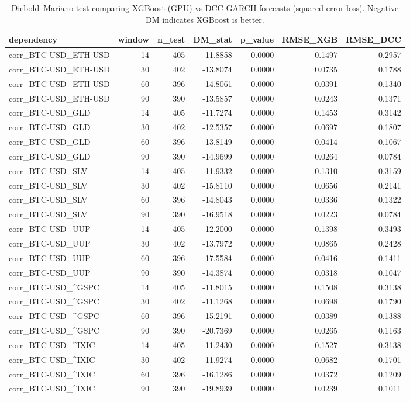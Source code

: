 \begin{table}[H]
\centering
\small
\caption{Diebold--Mariano test comparing XGBoost (GPU) vs DCC-GARCH forecasts (squared-error loss). Negative DM indicates XGBoost is better.}
\label{tab:dm_xgb_vs_dcc}
\begin{tabular}{lrrrrrr}
\toprule
dependency & window & n\_test & DM\_stat & p\_value & RMSE\_XGB & RMSE\_DCC \\
\midrule
corr\_BTC-USD\_ETH-USD & 14 & 405 & -11.8858 & 0.0000 & 0.1497 & 0.2957 \\
corr\_BTC-USD\_ETH-USD & 30 & 402 & -13.8074 & 0.0000 & 0.0735 & 0.1788 \\
corr\_BTC-USD\_ETH-USD & 60 & 396 & -14.8061 & 0.0000 & 0.0391 & 0.1340 \\
corr\_BTC-USD\_ETH-USD & 90 & 390 & -13.5857 & 0.0000 & 0.0243 & 0.1371 \\
corr\_BTC-USD\_GLD & 14 & 405 & -11.7274 & 0.0000 & 0.1453 & 0.3142 \\
corr\_BTC-USD\_GLD & 30 & 402 & -12.5357 & 0.0000 & 0.0697 & 0.1807 \\
corr\_BTC-USD\_GLD & 60 & 396 & -13.8149 & 0.0000 & 0.0414 & 0.1067 \\
corr\_BTC-USD\_GLD & 90 & 390 & -14.9699 & 0.0000 & 0.0264 & 0.0784 \\
corr\_BTC-USD\_SLV & 14 & 405 & -11.9332 & 0.0000 & 0.1310 & 0.3159 \\
corr\_BTC-USD\_SLV & 30 & 402 & -15.8110 & 0.0000 & 0.0656 & 0.2141 \\
corr\_BTC-USD\_SLV & 60 & 396 & -14.8043 & 0.0000 & 0.0336 & 0.1322 \\
corr\_BTC-USD\_SLV & 90 & 390 & -16.9518 & 0.0000 & 0.0223 & 0.0784 \\
corr\_BTC-USD\_UUP & 14 & 405 & -12.2000 & 0.0000 & 0.1398 & 0.3493 \\
corr\_BTC-USD\_UUP & 30 & 402 & -13.7972 & 0.0000 & 0.0865 & 0.2428 \\
corr\_BTC-USD\_UUP & 60 & 396 & -17.5584 & 0.0000 & 0.0416 & 0.1411 \\
corr\_BTC-USD\_UUP & 90 & 390 & -14.3874 & 0.0000 & 0.0318 & 0.1047 \\
corr\_BTC-USD\_\textasciicircum GSPC & 14 & 405 & -11.8015 & 0.0000 & 0.1508 & 0.3138 \\
corr\_BTC-USD\_\textasciicircum GSPC & 30 & 402 & -11.1268 & 0.0000 & 0.0698 & 0.1790 \\
corr\_BTC-USD\_\textasciicircum GSPC & 60 & 396 & -15.2191 & 0.0000 & 0.0389 & 0.1388 \\
corr\_BTC-USD\_\textasciicircum GSPC & 90 & 390 & -20.7369 & 0.0000 & 0.0265 & 0.1163 \\
corr\_BTC-USD\_\textasciicircum IXIC & 14 & 405 & -11.2430 & 0.0000 & 0.1527 & 0.3138 \\
corr\_BTC-USD\_\textasciicircum IXIC & 30 & 402 & -11.9274 & 0.0000 & 0.0682 & 0.1701 \\
corr\_BTC-USD\_\textasciicircum IXIC & 60 & 396 & -16.1286 & 0.0000 & 0.0372 & 0.1209 \\
corr\_BTC-USD\_\textasciicircum IXIC & 90 & 390 & -19.8939 & 0.0000 & 0.0239 & 0.1011 \\
\bottomrule
\end{tabular}

\end{table}
